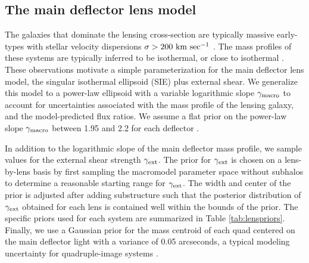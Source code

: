 \subsection{The main deflector lens model}
\label{ssec:macromodels}
The galaxies that dominate the lensing cross-section are typically massive early-types with stellar velocity dispersions $\sigma > 200 \ \rm{km} \ \rm{sec^{-1}}$ \cite{Gavazzi++07,Auger++10,Lagattuta++10}. The mass profiles of these systems are typically inferred to be isothermal, or close to isothermal \cite{Treu++06, Treu++09, Auger++10, Shankar++17}. These observations motivate a simple parameterization for the main deflector lens model, the singular isothermal ellipsoid (SIE) plus external shear. We generalize this model to a power-law ellipsoid with a variable logarithmic slope $\gamma_{\rm{macro}}$ to account for uncertainties associated with the mass profile of the lensing galaxy, and the model-predicted flux ratios. We assume a flat prior on the power-law slope $\gamma_{\rm{macro}}$ between 1.95 and 2.2 for each deflector \cite{Auger++10}. 

In addition to the logarithmic slope of the main deflector mass profile, we sample values for the external shear strength $\gamma_{\rm{ext}}$. The prior for $\gamma_{\rm{ext}}$ is chosen on a lens-by-lens basis by first sampling the macromodel parameter space without subhalos to determine a reasonable starting range for $\gamma_{\rm{ext}}$. The width and center of the prior is adjusted after adding substructure such that the posterior distribution of $\gamma_{\rm{ext}}$ obtained for each lens is contained well within the bounds of the prior. The specific priors used for each system are summarized in Table \ref{tab:lenspriors}. Finally, we use a Gaussian prior for the mass centroid of each quad centered on the main deflector light with a variance of 0.05 arcseconds, a typical modeling uncertainty for quadruple-image systems \cite{Shajib++18, Nierenberg++19}. 

